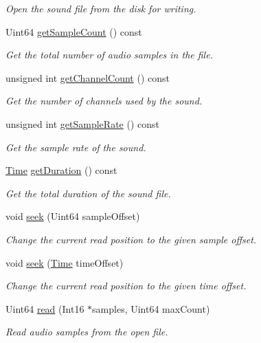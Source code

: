 \begin{DoxyCompactItemize}
\begin{DoxyCompactList}\small\item\em Open the sound file from the disk for writing. \end{DoxyCompactList}\item 
Uint64 \hyperlink{classsf_1_1_input_sound_file_a665b7fed6cdca3e0c622909e5a6655e4}{get\+Sample\+Count} () const
\begin{DoxyCompactList}\small\item\em Get the total number of audio samples in the file. \end{DoxyCompactList}\item 
unsigned int \hyperlink{classsf_1_1_input_sound_file_a54307c308ba05dea63aba54a29c804a4}{get\+Channel\+Count} () const
\begin{DoxyCompactList}\small\item\em Get the number of channels used by the sound. \end{DoxyCompactList}\item 
unsigned int \hyperlink{classsf_1_1_input_sound_file_a6b8177e40dd8020752f6d52f96b774c3}{get\+Sample\+Rate} () const
\begin{DoxyCompactList}\small\item\em Get the sample rate of the sound. \end{DoxyCompactList}\item 
\hyperlink{classsf_1_1_time}{Time} \hyperlink{classsf_1_1_input_sound_file_aa081bd4d9732408d10b48227a360778e}{get\+Duration} () const
\begin{DoxyCompactList}\small\item\em Get the total duration of the sound file. \end{DoxyCompactList}\item 
void \hyperlink{classsf_1_1_input_sound_file_aaf97be15020a42e159ff88f76f22af20}{seek} (Uint64 sample\+Offset)
\begin{DoxyCompactList}\small\item\em Change the current read position to the given sample offset. \end{DoxyCompactList}\item 
void \hyperlink{classsf_1_1_input_sound_file_a8eee7af58ad75ddc61f93ad72e2d66c1}{seek} (\hyperlink{classsf_1_1_time}{Time} time\+Offset)
\begin{DoxyCompactList}\small\item\em Change the current read position to the given time offset. \end{DoxyCompactList}\item 
Uint64 \hyperlink{classsf_1_1_input_sound_file_a83d6f64617456601edeb0daf9d14a17f}{read} (Int16 $\ast$samples, Uint64 max\+Count)
\begin{DoxyCompactList}\small\item\em Read audio samples from the open file. \end{DoxyCompactList}\end{DoxyCompactItemize}


